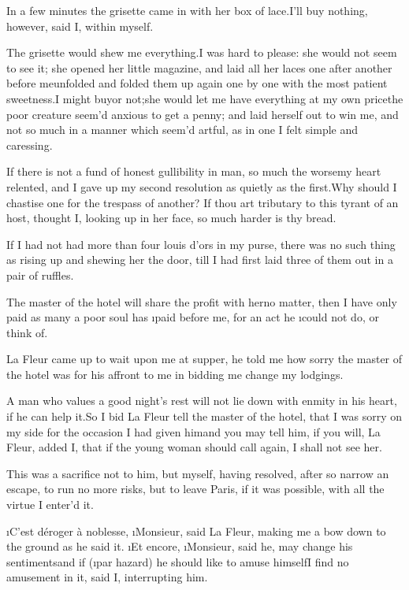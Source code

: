 \documentclass[twoside]{article}
\begin{document}
In a few minutes the grisette came in with
her box of lace.\tskk I’ll buy nothing,
however, said I, within myself.

The grisette would shew me
everything.\tskk I was hard to please: she
would not seem to see it; she opened her
little magazine, and laid all her laces
one after another before me\tskk unfolded
and folded them up again one by one with
the most patient sweetness.\tskk I might
buy\tskk or not;\tskk she would let me
have everything at my own price\tskk the
poor creature seem’d anxious to get a
penny; and laid herself out to win me, and
not so much in a manner which seem’d
artful, as in one I felt simple and
caressing.

If there is not a fund of honest
gullibility in man, so much the
worse\tskk my heart relented, and I gave
up my second resolution as quietly as the
first.\tskk Why should I chastise one for
the trespass of another?  If thou art
tributary to this tyrant of an host,
thought I, looking up in her face, so much
harder is thy bread.

If I had not had more than four louis
d’ors in my purse, there was no such thing
as rising up and shewing her the door,
till I had first laid three of them out in
a pair of ruffles.

\tskk The master of the hotel will share
the profit with her\tskk no matter,\tskk
then I have only paid as many a poor soul
has \i{paid} before me, for an act he
\i{could} not do, or think of.





\vskip 6pt


 La Fleur came up to wait
upon me at supper, he told me how sorry
the master of the hotel was for his
affront to me in bidding me change my
lodgings.

A man who values a good night’s rest will
not lie down with enmity in his heart, if
he can help it.\tskk So I bid La Fleur
tell the master of the hotel, that I was
sorry on my side for the occasion I had
given him\tskk and you may tell him, if
you will, La Fleur, added I, that if the
young woman should call again, I shall not
see her.

This was a sacrifice not to him, but
myself, having resolved, after so narrow
an escape, to run no more risks, but to
leave Paris, if it was possible, with all
the virtue I enter’d it.

\i{C’est déroger à noblesse},
\i{Monsieur}, said La Fleur, making me a
bow down to the ground as he said it.\tskk
\i{Et encore}, \i{Monsieur}, said he, may
change his sentiments\tskk and if (\i{par
hazard}) he should like to amuse
himself\tskk I find no amusement in it,
said I, interrupting him.\tskk 
\end{document}
